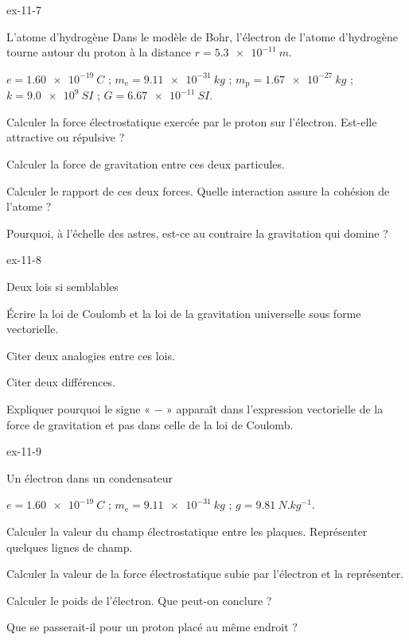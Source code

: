 \begin{blocLivre}{ex-11-7}
\begin{exercice}[2]{L'atome d'hydrogène}
Dans le modèle de Bohr, l'électron de l'atome d'hydrogène tourne autour du proton à la distance $r=\qty{5,3e-11}{m}$.
\begin{donnees}
$e=\qty{1,60e-19}{C}$ ; $m_\mathrm{e}=\qty{9,11e-31}{kg}$ ; $m_\mathrm{p}=\qty{1,67e-27}{kg}$ ; $k=\qty{9,0e9}{SI}$ ; $G=\qty{6,67e-11}{SI}$.
\end{donnees}
\begin{questions}
\item Calculer la force électrostatique exercée par le proton sur l'électron. Est-elle attractive ou répulsive ?
\item Calculer la force de gravitation entre ces deux particules.
\item Calculer le rapport de ces deux forces. Quelle interaction assure la cohésion de l'atome ?
\item Pourquoi, à l'échelle des astres, est-ce au contraire la gravitation qui domine ?
\end{questions}
\end{exercice}
\end{blocLivre}
\begin{blocLivre}{ex-11-8}
\begin{exercice}[2]{Deux lois si semblables}
\begin{questions}
\item Écrire la loi de Coulomb et la loi de la gravitation universelle sous forme vectorielle.
\item Citer deux analogies entre ces lois.
\item Citer deux différences.
\item Expliquer pourquoi le signe « $-$ » apparaît dans l'expression vectorielle de la force de gravitation et pas dans
celle de la loi de Coulomb.
\end{questions}
\end{exercice}
\end{blocLivre}
\begin{blocLivre}{ex-11-9}
\begin{exercice}[2]{Un électron dans un condensateur}
\begin{donnees}
$e=\qty{1,60e-19}{C}$ ; $m_\mathrm{e}=\qty{9,11e-31}{kg}$ ; $g=\qty{9,81}{N.kg^{-1}}$.
\end{donnees}
\begin{questions}
\item Calculer la valeur du champ électrostatique entre les plaques. Représenter quelques lignes de champ.
\item Calculer la valeur de la force électrostatique subie par l'électron et la représenter.
\item Calculer le poids de l'électron. Que peut-on conclure ?
\item Que se passerait-il pour un proton placé au même endroit ?
\end{questions}
\end{exercice}
\end{blocLivre}
